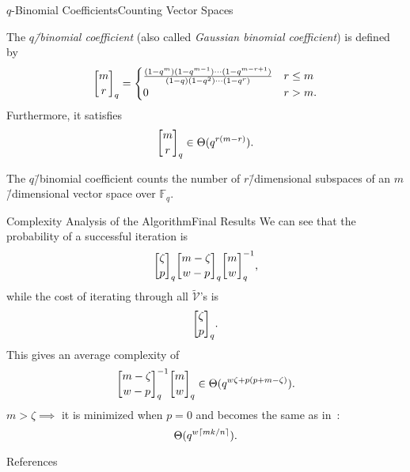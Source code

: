 \documentclass[usepdftitle=false]{beamer}
\newcommand*{\FF}{\ensuremath{\mathbb{F}}}
\DeclarePairedDelimiter{\ceil}{\lceil}{\rceil}
\DeclareRobustCommand{\qbinom}{\genfrac[]{0pt}{}}
\begin{document}
\begin{frame}{\(q\)-Binomial Coefficients}{Counting Vector Spaces}
  \begin{definition}
    The \emph{\(q\)\=/binomial coefficient} (also called
    \emph{Gaussian binomial coefficient}) is defined by
    \[
      \qbinom{m}{r}_q =
      \begin{cases}
        \frac{(1 - q^m) (1 - q^{m - 1}) \cdots (1 - q^{m - r + 1})}{(1 - q) (1 - q^2) \cdots (1 - q^r)} & r \le m\\
        0 & r > m\text.
      \end{cases}
    \]
    Furthermore, it satisfies
    \[
      \qbinom{m}{r}_q \in \Theta(q^{r (m - r)})\text.
    \]
  \end{definition}
  The \(q\)\=/binomial coefficient counts the \alert{number of
    \(r\)\=/dimensional subspaces of an \(m\)\=/dimensional vector
    space over \(\FF_q\)}.
\end{frame}

\begin{frame}{Complexity Analysis of the Algorithm}{Final Results}
  We can see that the probability of a successful iteration is
  \[
    \qbinom{\zeta}{p}_q \qbinom{m - \zeta}{w - p}_q \qbinom{m}{w}_q^{-1}\text,
  \]
  while the cost of iterating through all \(\tilde{\mathcal{V}}\)'s is
  \[
    \qbinom{\zeta}{p}_q\text.
  \]
  This gives an average complexity of
  \[
    \qbinom{m - \zeta}{w - p}_q^{-1} \qbinom{m}{w}_q \in \Theta(q^{w
      \zeta + p (p + m - \zeta)})\text.
  \]
  \(m > \zeta \implies\) it is minimized when \alert{\(p = 0\)} and
  becomes the same as in~\cite{GRS13}:
  \[
    \Theta(q^{w \ceil{m k / {n}}}).
  \]
\end{frame}

\begin{frame}[allowframebreaks]{References}
  \printbibliography{}
\end{frame}
\end{document}
